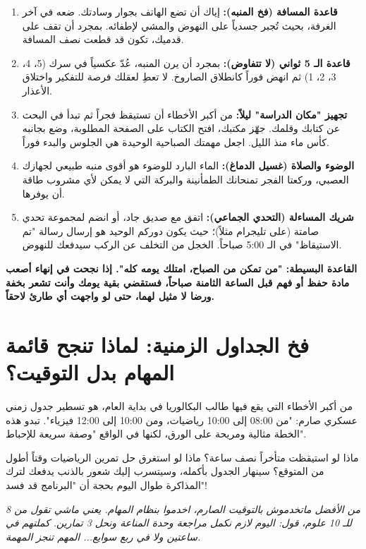 \documentclass[12pt,a4paper]{book}
\newcommand{\quoteAr}[1]{%
	\begin{myquote}
		\itshape #1
	\end{myquote}
}
\newcommand{\importantAr}[1]{%
	\begin{important}
		\bfseries #1
	\end{important}
}
\begin{document}
	\begin{enumerate}
		\item \textbf{قاعدة المسافة (فخ المنبه):} إياك أن تضع الهاتف بجوار وسادتك. ضعه في آخر الغرفة، بحيث تُجبر جسدياً على النهوض والمشي لإطفائه. بمجرد أن تقف على قدميك، تكون قد قطعت نصف المسافة.
		\item \textbf{قاعدة الـ 5 ثواني (لا تتفاوض):} بمجرد أن يرن المنبه، عُدّ عكسياً في سرك (5، 4، 3، 2، 1) ثم انهض فوراً كانطلاق الصاروخ. لا تعطِ لعقلك فرصة للتفكير واختلاق الأعذار.
		\item \textbf{تجهيز "مكان الدراسة" ليلاً:} من أكبر الأخطاء أن تستيقظ فجراً ثم تبدأ في البحث عن كتابك وقلمك. جهّز مكتبك، افتح الكتاب على الصفحة المطلوبة، وضع بجانبه كأس ماء منذ الليل. اجعل مهمتك الصباحية الوحيدة هي الجلوس والبدء فوراً.
		\item \textbf{الوضوء والصلاة (غسيل الدماغ):} الماء البارد للوضوء هو أقوى منبه طبيعي لجهازك العصبي، وركعتا الفجر تمنحانك الطمأنينة والبركة التي لا يمكن لأي مشروب طاقة أن يوفرها.
		\item \textbf{شريك المساءلة (التحدي الجماعي):} اتفق مع صديق جاد، أو انضم لمجموعة تحدي صامتة (على تليجرام مثلاً)؛ حيث يكون دوركم الوحيد هو إرسال رسالة "تم الاستيقاظ" في الـ 5:00 صباحاً. الخجل من التخلف عن الركب سيدفعك للنهوض.
	\end{enumerate}
	
	\importantAr{القاعدة البسيطة: "من تمكن من الصباح، امتلك يومه كله". إذا نجحت في إنهاء أصعب مادة حفظ أو فهم قبل الساعة الثامنة صباحاً، فستقضي بقية يومك وأنت تشعر بخفة ورضا لا مثيل لهما، حتى لو واجهت أي طارئ لاحقاً.}
	
\section{فخ الجداول الزمنية: لماذا تنجح قائمة المهام بدل التوقيت؟}
\label{sec:owner-experiences8}

من أكبر الأخطاء التي يقع فيها طالب البكالوريا في بداية العام، هو تسطير جدول زمني عسكري صارم: "من 08:00 إلى 10:00 رياضيات، ومن 10:00 إلى 12:00 فيزياء". تبدو هذه الخطة مثالية ومريحة على الورق، لكنها في الواقع "وصفة سريعة للإحباط". 

ماذا لو استيقظت متأخراً نصف ساعة؟ ماذا لو استغرق حل تمرين الرياضيات وقتاً أطول من المتوقع؟ سينهار الجدول بأكمله، وسيتسرب إليك شعور بالذنب يدفعك لترك المذاكرة طوال اليوم بحجة أن "البرنامج قد فسد"!

\quoteAr{من الأفضل ماتخدموش بالتوقيت الصارم، اخدموا بنظام المهام. يعني ماشي تقول من 8 للـ 10 علوم، قول: اليوم لازم نكمل مراجعة وحدة المناعة ونحل 3 تمارين. كملتهم في ساعتين ولا في ربع سوايع... المهم تنجز المهمة.}
\end{document}
